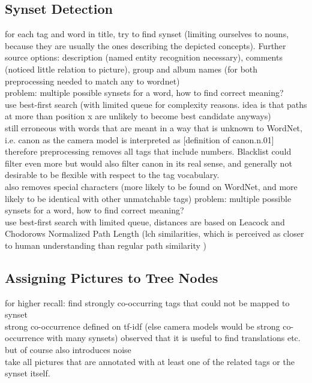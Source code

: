 \subsection{Synset Detection}
for each tag and word in title, try to find synset (limiting ourselves to nouns, because they are usually the ones describing the depicted concepts). Further source options: description (named entity recognition necessary), comments (noticed little relation to picture), group and album names (for both preprocessing needed to match any to wordnet)  \\
problem: multiple possible synsets for a word, how to find correct meaning? \\
use best-first search (with limited queue for complexity reasons. idea is that paths at more than position x are unlikely to become best candidate anyways) \\
still erroneous with words that are meant in a way that is unknown to WordNet, i.e. canon as the camera model is interpreted as [definition of canon.n.01]  \\
therefore preprocessing removes all tags that include numbers. Blacklist could filter even more but would also filter canon in its real sense, and generally not desirable to be flexible with respect to the tag vocabulary.  \\
also removes special characters (more likely to be found on WordNet, and more likely to be identical with other unmatchable tags) 
problem: multiple possible synsets for a word, how to find correct meaning? \\
use best-first search with limited queue, distances are based on Leacock and Chodorows Normalized Path Length (lch similarities, which is perceived as closer to human understanding than regular path similarity \cite{budanitsky01} )

\subsection{Assigning Pictures to Tree Nodes}
for higher recall: find strongly co-occurring tags that could not be mapped to synset \\
strong co-occurrence defined on tf-idf (else camera models would be strong co-occurrence with many synsets)
observed that it is useful to find translations etc. but of course also introduces noise \\
take all pictures that are annotated with at least one of the related tags or the synset itself.
